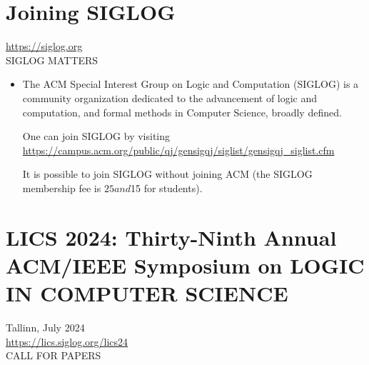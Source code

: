 \documentclass[prodmode,acmtecs]{acmsmall} %
\begin{document}
\section{Joining SIGLOG}\label{JoiningSIGLOG}  \href{https://siglog.org}{https://siglog.org}\\ 
SIGLOG MATTERS 

\begin{itemize}\item  The ACM Special Interest Group on Logic and Computation (SIGLOG) is a community organization dedicated to the advancement of logic and computation, and formal methods in Computer Science, broadly defined.  
 
  One can join SIGLOG by visiting \href{https://campus.acm.org/public/qj/gensigqj/siglist/gensigqj_siglist.cfm}{https://campus.acm.org/public/qj/gensigqj/siglist/gensigqj\_siglist.cfm}  
 
  It is possible to join SIGLOG without joining ACM (the SIGLOG membership fee is $25 and $15 for students). 
 
\end{itemize}\section{LICS 2024: Thirty-Ninth Annual ACM/IEEE Symposium on LOGIC IN COMPUTER SCIENCE}\label{LICS2024}  Tallinn, July 2024\\ 
  \href{https://lics.siglog.org/lics24}{https://lics.siglog.org/lics24}\\ 
CALL FOR PAPERS 
\end{document}
